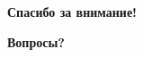 \documentclass{beamer}
\begin{document}











\begin{frame}
\frametitle{}

\Huge \bf Спасибо за внимание!

 \Huge \bf Вопросы?
\end{frame}
\end{document}
